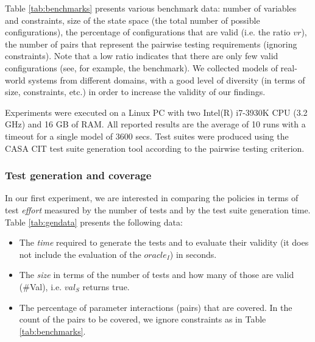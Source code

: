 \begin{tikzborder}{\cite{Gargantini16:validation}}
	
	\bb Table \ref{tab:benchmarks} presents various benchmark data: number of variables and constraints, 
	size of the state space (the total number of possible configurations), the percentage of configurations that are valid  (i.e. the ratio $vr$), the number of pairs that represent the pairwise testing requirements (ignoring constraints). Note that a low ratio indicates that there are only few valid configurations (see, for example, the \TLSChecker benchmark). We collected models of real-world systems from different domains, with a good level of diversity (in terms of size, constraints, etc.) in order to increase the validity of our findings.
	
	Experiments were executed on a Linux PC with two Intel(R) i7-3930K CPU  (3.2 GHz) and 16 GB of RAM. All reported results are the average of 10 runs with a timeout for a single model of 3600 secs. Test suites were produced using the CASA CIT test suite generation tool according to the pairwise testing criterion.
	\be
	
	\subsubsection{Test generation and coverage}
	
	\bb In our first experiment, we are interested in comparing the policies in terms of test \emph{effort} measured by the number of tests and by the test suite generation time.
	Table \ref{tab:gendata} presents the following data:
	\begin{itemize}
		\item The \emph{time} required to generate the tests and to evaluate their validity (it does not include the evaluation of the $oracle_{I}$) in seconds.
		\item The \emph{size} in terms of the number of tests and how many of those are valid (\#Val), i.e.   $val_{S}$  returns true. %
		\item The percentage of parameter interactions (pairs) that are covered. In the count of the pairs to be covered, we ignore constraints as in Table \ref{tab:benchmarks}.
	\end{itemize}
	\be
	

\end{tikzborder}

